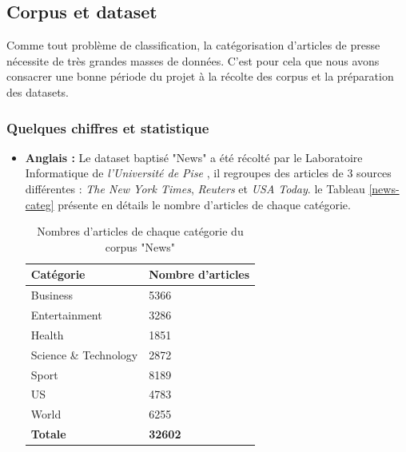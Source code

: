     \subsection{Corpus et dataset}
        Comme tout problème de classification, la catégorisation d'articles de presse nécessite de très grandes masses de données. C'est pour cela que nous avons consacrer une bonne période du projet à la récolte des corpus et la préparation des datasets.     
        \subsubsection{Quelques chiffres et statistique}
            \begin{itemize}
                \item{\textbf{Anglais : }}
                 Le dataset baptisé "News" a été récolté par le Laboratoire Informatique de \emph{l'Université de Pise} \cite{pise}, il regroupes des articles de 3 sources différentes : \emph{The New York Times}, \emph{Reuters} et \emph{USA Today}. le Tableau \ref{news-categ} présente en détails le nombre d'articles de chaque catégorie.
                \begin{table}[H]
                    \begin{center}
                        \begin{tabular}{|C{5cm}|C{5cm}|}
                            \hline
                            \textbf{Catégorie} &  \textbf{Nombre d'articles} \\
                            \hline
                            Business & 5366 \\                            
                            Entertainment & 3286 \\
                            Health & 1851 \\
                            Science \& Technology & 2872 \\
                            Sport & 8189 \\
                            US & 4783 \\
                            World & 6255 \\
                            \textbf{Totale} &  \textbf{32602} \\
                            \hline
                        \end{tabular}
                    \end{center}
                    \caption{Nombres d'articles de chaque catégorie du corpus "News"}

\end{table}
\end{itemize}
